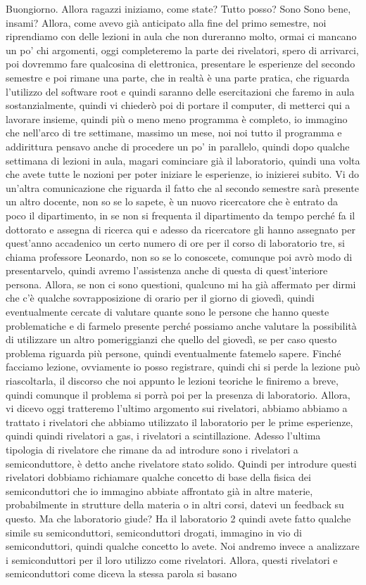 {Buongiorno. Allora ragazzi iniziamo, come state? Tutto posso? Sono Sono bene, insami? Allora, come avevo già anticipato alla fine del primo semestre, noi riprendiamo con delle lezioni in aula che non dureranno molto, ormai ci mancano un po' chi argomenti, oggi completeremo la parte dei rivelatori, spero di arrivarci, poi dovremmo fare qualcosina di elettronica, presentare le esperienze del secondo semestre e poi rimane una parte, che in realtà è una parte pratica, che riguarda l'utilizzo del software root e quindi saranno delle esercitazioni che faremo in aula sostanzialmente, quindi vi chiederò poi di portare il computer, di metterci qui a lavorare insieme, quindi più o meno meno programma è completo, io immagino che nell'arco di tre settimane, massimo un mese, noi noi tutto il programma e addirittura pensavo anche di procedere un po' in parallelo, quindi dopo qualche settimana di lezioni in aula, magari cominciare già il laboratorio, quindi una volta che avete tutte le nozioni per poter iniziare le esperienze, io inizierei subito. Vi do un'altra comunicazione che riguarda il fatto che al secondo semestre sarà presente un altro docente, non so se lo sapete, è un nuovo ricercatore che è entrato da poco il dipartimento, in se non si frequenta il dipartimento da tempo perché fa il dottorato e assegna di ricerca qui e adesso da ricercatore gli hanno assegnato per quest'anno accadenico un certo numero di ore per il corso di laboratorio tre, si chiama professore Leonardo, non so se lo conoscete, comunque poi avrò modo di presentarvelo, quindi avremo l'assistenza anche di questa di quest'interiore persona. Allora, se non ci sono questioni, qualcuno mi ha già affermato per dirmi che c'è qualche sovrapposizione di orario per il giorno di giovedì, quindi eventualmente cercate di valutare quante sono le persone che hanno queste problematiche e di farmelo presente perché possiamo anche valutare la possibilità di utilizzare un altro pomeriggianzi che quello del giovedì, se per caso questo problema riguarda più persone, quindi eventualmente fatemelo sapere. Finché facciamo lezione, ovviamente io posso registrare, quindi chi si perde la lezione può riascoltarla, il discorso che noi appunto le lezioni teoriche le finiremo a breve, quindi comunque il problema si porrà poi per la presenza di laboratorio. Allora, vi dicevo oggi tratteremo l'ultimo argomento sui rivelatori, abbiamo abbiamo a trattato i rivelatori che abbiamo utilizzato il laboratorio per le prime esperienze, quindi quindi rivelatori a gas, i rivelatori a scintillazione. Adesso l'ultima tipologia di rivelatore che rimane da ad introdure sono i rivelatori a semiconduttore, è detto anche rivelatore stato solido. Quindi per introdure questi rivelatori dobbiamo richiamare qualche concetto di base della fisica dei semiconduttori che io immagino abbiate affrontato già in altre materie, probabilmente in strutture della materia o in altri corsi, datevi un feedback su questo. Ma che laboratorio giude? Ha il laboratorio 2 quindi avete fatto qualche simile su semiconduttori, semiconduttori drogati, immagino in vio di semiconduttori, quindi qualche concetto lo avete. Noi andremo invece a analizzare i semiconduttori per il loro utilizzo come rivelatori. Allora, questi rivelatori e semiconduttori come diceva la stessa parola si basano }
